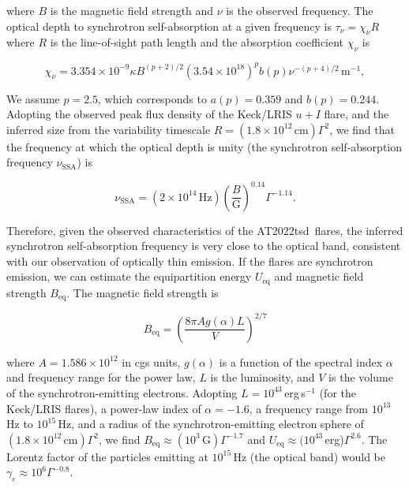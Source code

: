 \documentclass{nature_plusfigure}
\newcommand{\at}{AT2022tsd}
\begin{document}
\begin{methods}
\noindent where $B$ is the magnetic field strength and $\nu$ is the observed frequency. The optical depth to synchrotron self-absorption at a given frequency is $\tau_\nu = \chi_\nu R$ where $R$ is the line-of-sight path length and the absorption coefficient $\chi_\nu$ is

\begin{equation}
\label{eq:synchrotron-tau}
\chi_\nu = 3.354\times10^{-9} \kappa B^{(p+2)/2} (3.54\times10^{18})^p b(p) \nu^{-(p+4)/2}\,\mathrm{m}^{-1},
\end{equation}

We assume $p=2.5$, which corresponds to\cite{Longair2011} $a(p)=0.359$ and $b(p)=0.244$. Adopting the observed peak flux density of the Keck/LRIS $u+I$ flare, and the inferred size from the variability timescale $R=(1.8\times10^{12}\,\mathrm{cm})\Gamma^2$, we find that the frequency at which the optical depth is unity (the synchrotron self-absorption frequency $\nu_\mathrm{SSA}$) is

\begin{equation}
\label{eq:ssa}
\nu_\mathrm{SSA} = (2\times10^{14}\,\mathrm{Hz}) \left(\frac{B}{\mathrm{G}} \right)^{0.14} \Gamma^{-1.14}.
\end{equation}

\noindent Therefore, given the observed characteristics of the \at\ flares, the inferred synchrotron self-absorption frequency is very close to the optical band, consistent with our observation of optically thin emission.
If the flares are synchrotron emission, we can  
estimate the equipartition energy $U_\mathrm{eq}$ and magnetic field strength $B_\mathrm{eq}$. The magnetic field strength is

\begin{equation}
B_\mathrm{eq} = \left( \frac{8\pi A g(\alpha) L}{V} \right)^{2/7}
\end{equation}

\noindent where $A=1.586\times10^{12}$ in cgs units, $g(\alpha)$ is a function of the spectral index $\alpha$ and frequency range for the power law, $L$ is the luminosity, and $V$ is the volume of the synchrotron-emitting electrons. Adopting $L=10^{43}\,$erg\,s$^{-1}$ (for the Keck/LRIS flares), a power-law index of $\alpha=-1.6$, a frequency range from $10^{13}$\,Hz to $10^{15}$\,Hz, and a radius of the synchrotron-emitting electron sphere of $(1.8\times10^{12}\,\mathrm{cm})\Gamma^2$, we find $B_\mathrm{eq}\approx(10^{3}\,\mathrm{G})\Gamma^{-1.7}$ and $U_\mathrm{eq}\approx(10^{43}\,$erg)$\Gamma^{2.6}$. The Lorentz factor of the particles emitting at $10^{15}$\,Hz (the optical band) would be $\gamma_e\approx10^{6} \Gamma^{-0.8}$.


\end{methods}
\end{document}
